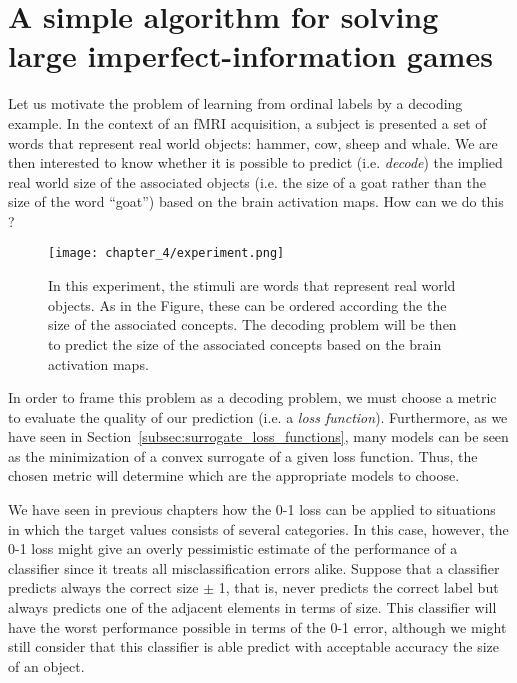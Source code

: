 \newpage 
\vspace*{\fill}
\minitoc
\vspace*{\fill}
\newpage

%

\section{A simple algorithm for solving large imperfect-information games}

Let us motivate the problem of learning from ordinal labels by a decoding example. In the context of an fMRI acquisition, a subject is presented a set of words that represent real world objects:
hammer, cow, sheep and whale. We are then interested to know whether it is possible to predict (i.e. \emph{decode}) the implied real world size of the associated objects (i.e. the size of a goat rather than the size of the word ``goat'') based on the brain activation maps. How can we do this ?


\begin{figure}
\texttt{[image: chapter\_4/experiment.png]}
\caption{In this experiment, the stimuli are words that represent real world objects. As in the Figure, these can be ordered according the the size of the associated concepts. The decoding problem will be then to predict the size of the associated concepts based on the brain activation maps.}
\end{figure}



In order to frame this problem as a \gls{decoding} problem, we must choose a metric to evaluate the quality of our prediction (i.e. a \emph{loss function}). Furthermore, as we have seen in Section~\ref{subsec:surrogate_loss_functions}, many models can be seen as the minimization of a convex surrogate of a given loss function. Thus, the chosen metric will determine which are the appropriate models to choose.



We have seen in previous chapters how the 0-1 loss can be applied to situations in which the target values consists of several categories. In this case, however, the 0-1 loss might give an overly pessimistic estimate of the performance of a classifier since it treats all misclassification errors alike. Suppose that a classifier predicts always the correct size $\pm$ 1, that is, never predicts the correct label but always predicts one of the adjacent elements in terms of size. This classifier will have the worst performance possible in terms of the 0-1 error, although we might still consider that this classifier is able predict with acceptable accuracy the size of an object.


